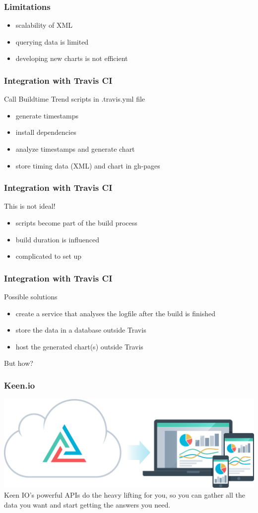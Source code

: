 \documentclass[14pt]{beamer}
\begin{document}
  \begin{frame}
    \frametitle{Limitations}
    \begin{itemize}
      \item scalability of XML
      \item querying data is limited
      \item developing new charts is not efficient
    \end{itemize}
  \end{frame}
  \begin{frame}
    \frametitle{Integration with Travis CI}
    Call Buildtime Trend scripts in .travis.yml file
    \begin{itemize}
      \item generate timestamps
      \item install dependencies
      \item analyze timestamps and generate chart
      \item store timing data (XML) and chart in gh-pages
    \end{itemize}
  \end{frame}
  \begin{frame}
    \frametitle{Integration with Travis CI}
    This is not ideal!
    \begin{itemize}
      \item scripts become part of the build process
      \item build duration is influenced
      \item complicated to set up
    \end{itemize}
  \end{frame}
  \begin{frame}
    \frametitle{Integration with Travis CI}
    Possible solutions
    \begin{itemize}
      \item create a service that analyses the logfile after the build is finished
      \item store the data in a database outside Travis
      \item host the generated chart(s) outside Travis
    \end{itemize}
    But how?
  \end{frame}
  \begin{frame}
    \frametitle{Keen.io}
    \includegraphics[scale=.20]{keenio_workflow.png}\\
    Keen IO's powerful APIs do the heavy lifting for you, so you can gather all the data you want and start getting the answers you need. 
  \end{frame}
\end{document}
